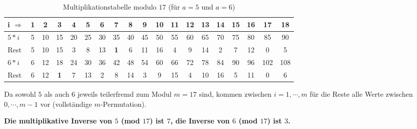 \begin{refsegment}
\begin{table}[ht]
\begin{center}
\begin{tabular}{|l@{\:}||c|c|c|c|c|c|c|c|c|c|c|c|c|c|c|c||c|c|}
\hline
i $\Rightarrow$     & 1  & 2  & 3  & 4  & 5  & 6  & 7  & 8  & 9 & 10 & 11 & 12 & 13 & 14 & 15 & 16  & 17 & 18\\
\hline
\hline
$5*i$               & 5 & 10 & 15 & 20 & 25 & 30 & 35 & 40 & 45 & 50 & 55 & 60 & 65 & 70 & 75 & 80  & 85 & 90\\
Rest                & 5 & 10 & 15  & 3  & 8 & 13  & \textbf{1}  & 6 & 11 & 16  & 4  & 9 & 14  & 2  & 7 & 12   & 0  & 5\\
\hline
$6*i$               & 6 & 12 & 18 & 24 & 30 & 36 & 42 & 48 & 54 & 60 & 66 & 72 & 78 & 84 & 90 & 96 & 102 & 108\\
Rest                & 6 & 12  & \textbf{1}  & 7 & 13  & 2  & 8 & 14  & 3  & 9 & 15  & 4 & 10 & 16  & 5 & 11   & 0  & 6\\
\hline
\end{tabular}
\end{center}
\caption{Multiplikationstabelle modulo $17$ (für $a=5$ und $a=6$)}
\label{SrcArith1a} \label{mulmod17}
\end{table}

Da sowohl $5$ als auch $6$ jeweils teilerfremd  zum Modul
$m=17$ sind, kommen zwischen $i=1, \cdots, m$ für die Reste alle Werte zwischen
$0, \cdots, m-1$ vor (vollständige $m$-Permutation).

\noindent \textbf{Die multiplikative Inverse von $5$ (mod $17$)
ist $7$, die Inverse von $6$ (mod $17$) ist $3$.}





\end{refsegment}
